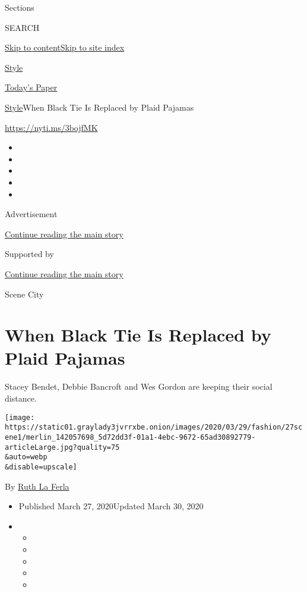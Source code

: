 Sections

SEARCH

\protect\hyperlink{site-content}{Skip to
content}\protect\hyperlink{site-index}{Skip to site index}

\href{https://www.nytimes3xbfgragh.onion/section/style}{Style}

\href{https://myaccount.nytimes3xbfgragh.onion/auth/login?response_type=cookie\&client_id=vi}{}

\href{https://www.nytimes3xbfgragh.onion/section/todayspaper}{Today's
Paper}

\href{/section/style}{Style}\textbar{}When Black Tie Is Replaced by
Plaid Pajamas

\url{https://nyti.ms/3bojfMK}

\begin{itemize}
\item
\item
\item
\item
\item
\end{itemize}

Advertisement

\protect\hyperlink{after-top}{Continue reading the main story}

Supported by

\protect\hyperlink{after-sponsor}{Continue reading the main story}

Scene City

\hypertarget{when-black-tie-is-replaced-by-plaid-pajamas}{%
\section{When Black Tie Is Replaced by Plaid
Pajamas}\label{when-black-tie-is-replaced-by-plaid-pajamas}}

Stacey Bendet, Debbie Bancroft and Wes Gordon are keeping their social
distance.

\texttt{[image: https://static01.graylady3jvrrxbe.onion/images/2020/03/29/fashion/27scene1/merlin\_142057698\_5d72dd3f-01a1-4ebc-9672-65ad30892779-articleLarge.jpg?quality=75\\\&auto=webp\\\&disable=upscale]}

By \href{https://www.nytimes3xbfgragh.onion/by/ruth-la-ferla}{Ruth La
Ferla}

\begin{itemize}
\item
  Published March 27, 2020Updated March 30, 2020
\item
  \begin{itemize}
  \item
  \item
  \item
  \item
  \item
  \end{itemize}
\end{itemize}

